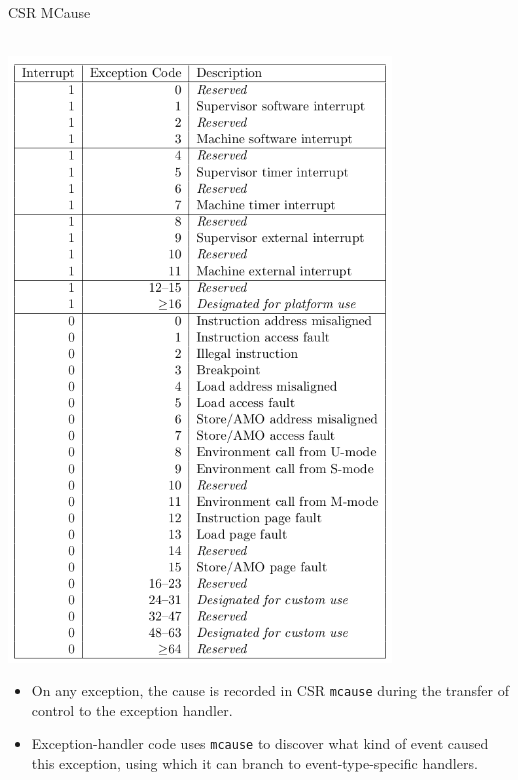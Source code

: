 \documentclass{article}
\newcommand{\hm}{\hspace*{1em}}
\newcommand{\hmm}{\hspace*{2em}}
\newcommand{\hmmmm}{\hspace*{4em}}
\begin{document}
\clearpage


\begin{center}
  {\Huge
    CSR MCause}
\end{center}

\vspace*{0.2in}

\hmmmm
\begin{minipage}[t]{4in}
  \hmm \\
  \includegraphics[width=4in]{Figs/CSR_MCause.png}
\end{minipage}
\hm
\begin{minipage}[t]{4.5in}
  \hmm

  \vspace{1in}

  \begin{itemize}\Large
  \item On any exception, the cause is recorded in CSR {\tt mcause}
    during the transfer of control to the exception handler.

  \item Exception-handler code uses {\tt mcause} to discover what kind
    of event caused this exception, using which it can branch to
    event-type-specific handlers.
  \end{itemize}
\end{minipage}
\end{document}
